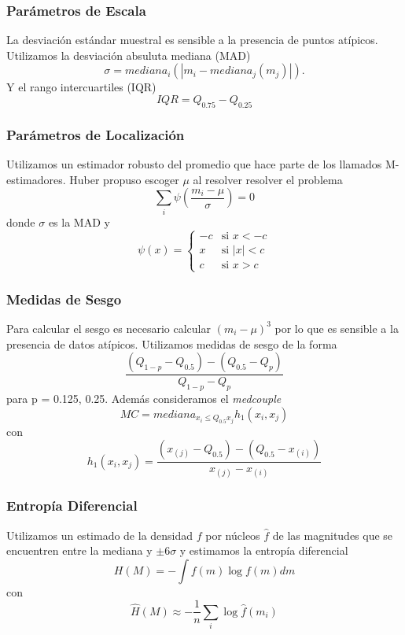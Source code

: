 \documentclass{beamer}
\begin{document}
\begin{frame}
  \frametitle{Parámetros de Escala}
  La desviación estándar muestral es sensible a la presencia de puntos atípicos. Utilizamos la desviación absuluta mediana (MAD)
  \begin{equation}
    \sigma = mediana_i(|m_i-mediana_j(m_j)|).
  \end{equation} 
  Y el rango intercuartiles (IQR)
  \begin{equation}
    IQR = Q_{0.75}-Q_{0.25}
  \end{equation}
\end{frame}

\begin{frame}
  \frametitle{Parámetros de Localización}
  Utilizamos un estimador robusto del promedio que hace parte de los llamados M-estimadores. Huber propuso escoger $\mu$ al resolver resolver el problema 
  \begin{equation}
    \sum_i\psi\left(\frac{m_i-\mu}{\sigma}\right) = 0
  \end{equation}
  donde $\sigma$ es la MAD y 
  \begin{equation}
    \psi(x) = \begin{cases} 
      -c &\mbox{si } x < -c \\ 
      x & \mbox{si } |x|<c\\
      c & \mbox{si } x>c
    \end{cases}
  \end{equation}
\end{frame}

\begin{frame}
  \frametitle{Medidas de Sesgo}
  Para calcular el sesgo es necesario calcular $(m_i-\mu)^3$ por lo que es sensible a la presencia de datos atípicos. Utilizamos medidas de sesgo de la forma 
  \begin{equation}
    \frac{(Q_{1-p}-Q_{0.5})-(Q_{0.5}-Q_p)}{Q_{1-p}-Q_{p}}
  \end{equation}
  para p = 0.125, 0.25. Además consideramos el \textit{medcouple}
  \begin{equation}
    MC = mediana_{x_i\leq Q_{0.5} x_j} h_1(x_i,x_j)
  \end{equation}
  con
  \begin{equation}
    h_1(x_i,x_j) = \frac{(x_{(j)}-Q_{0.5})-(Q_{0.5}-x_{(i)})}{x_{(j)}-x_{(i)}}
  \end{equation}

\end{frame}

\begin{frame}
  \frametitle{Entropía Diferencial}
  Utilizamos un estimado de la densidad $f$ por núcleos $\hat{f}$ de las magnitudes que se encuentren entre la mediana y $\pm 6\sigma$ y estimamos la entropía diferencial 
  \begin{equation}
    H(M) = -\int f(m)\log f(m) dm
  \end{equation}
  con 
  \begin{equation}
    \hat{H}(M) \approx -\frac{1}{n}\sum_i\log\hat{f}(m_i)
  \end{equation}
\end{frame}
\end{document}
